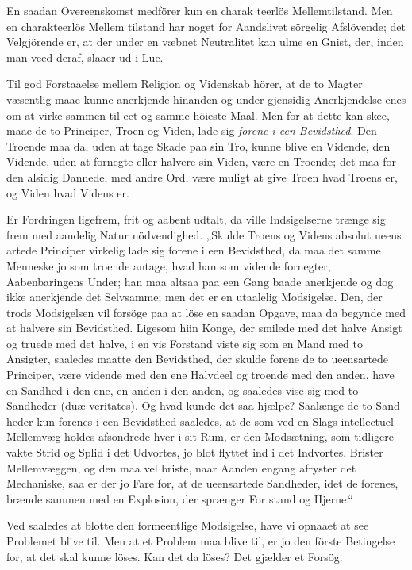 \documentclass[12pt,a4paper]{article}
\newcommand{\opage}[1]{\marginnote{\footnotesize\textit{[#1]}}}
\begin{document}
En saadan Overeenskomst medförer kun en charak\-%
teerlös Mellemtilstand. Men en charakteerlös Mellem\-%
tilstand har noget for Aandslivet sörgelig Afslövende; det
Velgjörende er, at der under en væbnet Neutralitet kan
ulme en Gnist, der, inden man veed deraf, slaaer ud i Lue.

Til god Forstaaelse mellem Religion og Videnskab
hörer, at de to Magter væsentlig maae kunne anerkjende
hinanden og under gjensidig Anerkjendelse enes om at
virke sammen til eet og samme höieste Maal. Men for
at dette kan skee, maae de to Principer, Troen og Viden,
lade sig \emph{forene i een Bevidsthed}. Den Troende
maa da, uden at tage Skade paa sin Tro, kunne blive
en Vidende, den Vidende, uden at fornegte eller halvere
sin Viden, være en Troende; det maa for den alsidig
Dannede, med andre Ord, være muligt at give Troen
hvad Troens er, og Viden hvad Videns er.

Er Fordringen ligefrem, frit og aabent udtalt, da
ville Indsigelserne trænge sig frem med aandelig Natur\-%
nödvendighed. „Skulde Troens og Videns absolut ueens\-%
artede Principer virkelig lade sig forene i een Bevidsthed,
da maa det samme Menneske jo som troende antage,
hvad han som vidende fornegter, Aabenbaringens Under;
han maa altsaa paa een Gang baade anerkjende og dog
ikke anerkjende det Selvsamme; men det er en utaalelig
\opage{65}Modsigelse. Den, der trods Modsigelsen vil forsöge paa at
löse en saadan Opgave, maa da begynde med at halvere sin
Bevidsthed. Ligesom hiin Konge, der smilede med det
halve Ansigt og truede med det halve, i en vis Forstand
viste sig som en Mand med to Ansigter, saaledes maatte den
Bevidsthed, der skulde forene de to ueensartede Principer,
være vidende med den ene Halvdeel og troende med den
anden, have en Sandhed i den ene, en anden i den anden,
og saaledes vise sig med to Sandheder (duæ veritates).
Og hvad kunde det saa hjælpe? Saalænge de to Sand\-%
heder kun forenes i een Bevidsthed saaledes, at de som
ved en Slags intellectuel Mellemvæg holdes afsondrede
hver i sit Rum, er den Modsætning, som tidligere vakte
Strid og Splid i det Udvortes, jo blot flyttet ind i det
Indvortes. Brister Mellemvæggen, og den maa vel briste,
naar Aanden engang afryster det Mechaniske, saa er der
jo Fare for, at de ueensartede Sandheder, idet de forenes,
brænde sammen med en Explosion, der sprænger For\-%
stand og Hjerne.“

Ved saaledes at blotte den formeentlige Modsigelse,
have vi opnaaet at see Problemet blive til. Men at et
Problem maa blive til, er jo den förste Betingelse for,
at det skal kunne löses. Kan det da löses? Det gjælder
et Forsög.
\end{document}
